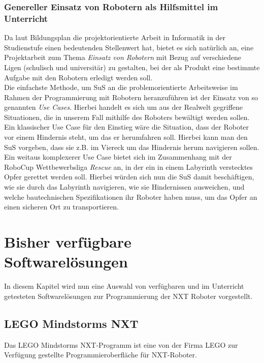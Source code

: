 \documentclass[paper=a4, pagesize, DIV=calc, BCOR=12.5mm, twoside=on, onecolumn=on, open = any, titlepage =on, parskip =half-, headsepline = on, footsepline = on, chapterprefix = on, appendixprefix = off, fontsize = 12pt, numbers = noenddot, abstract = on]{scrbook}
\numberwithin{equation}{chapter}
\theoremstyle{definition}
\theoremstyle{plain}
\theoremstyle{plain}
\theoremstyle{remark}
\theoremstyle{plain}
\theoremstyle{plain}
\begin{document}
\subsubsection{Genereller Einsatz von Robotern als Hilfsmittel im Unterricht}
Da laut Bildungsplan die projektorientierte Arbeit in Informatik in der Studienstufe einen bedeutenden Stellenwert hat, bietet es sich natürlich an, eine Projektarbeit zum Thema \emph{Einsatz von Robotern} mit Bezug auf verschiedene Ligen (schulisch und universitär) zu gestalten, bei der als Produkt eine bestimmte Aufgabe mit den Robotern erledigt werden soll. \\

Die einfachste Methode, um SuS an die problemorientierte Arbeitsweise im Rahmen der Programmierung mit Robotern heranzuführen ist der Einsatz von so genannten \emph{Use Cases}. Hierbei handelt es sich um aus der Realwelt gegriffene  Situationen, die in unserem Fall mithilfe des Roboters bewältigt werden sollen. Ein klassischer Use Case für den Einstieg wäre die Situation, dass der Roboter vor einem Hindernis steht, um das er herumfahren soll. Hierbei kann man den SuS vorgeben, dass sie z.B. im Viereck um das Hindernis herum navigieren sollen.
Ein weitaus komplexerer Use Case bietet sich im Zusammenhang mit der RoboCup Wettbewerbsliga \emph{Rescue} an, in der ein in einem Labyrinth verstecktes Opfer gerettet werden soll. Hierbei würden sich nun die SuS damit beschäftigen, wie sie durch das Labyrinth navigieren, wie sie Hindernissen ausweichen, und welche bautechnischen Spezifikationen ihr Roboter haben muss, um das Opfer an einen sicheren Ort zu transportieren.

\section{Bisher verfügbare Softwarelösungen}
\label{sec:software bisher}
In diesem Kapitel wird nun eine Auswahl von verfügbaren und im Unterricht getesteten Softwarelösungen zur Programmierung der NXT Roboter vorgestellt.

\subsection{LEGO Mindstorms NXT}
\label{sec:LMNXT}

Das LEGO Mindstorms NXT-Programm ist eine von der Firma LEGO zur Verfügung gestellte Programmieroberfläche für NXT-Roboter. 
\end{document}
